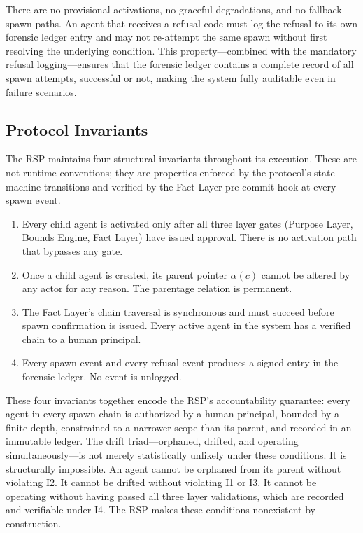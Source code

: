 There are no provisional activations, no graceful degradations, and no fallback spawn paths. An agent that receives a refusal code must log the refusal to its own forensic ledger entry and may not re-attempt the same spawn without first resolving the underlying condition. This property—combined with the mandatory refusal logging—ensures that the forensic ledger contains a complete record of all spawn attempts, successful or not, making the system fully auditable even in failure scenarios.

\subsection{Protocol Invariants}

The RSP maintains four structural invariants throughout its execution. These are not runtime conventions; they are properties enforced by the protocol's state machine transitions and verified by the Fact Layer pre-commit hook at every spawn event.

\begin{enumerate}
    \item[\textbf{I1 — No orphan activation.}] Every child agent is activated only after all three layer gates (Purpose Layer, Bounds Engine, Fact Layer) have issued approval. There is no activation path that bypasses any gate.
    \item[\textbf{I2 — Immutable parentage.}] Once a child agent is created, its parent pointer $\alpha(c)$ cannot be altered by any actor for any reason. The parentage relation is permanent.
    \item[\textbf{I3 — Verified chain termination.}] The Fact Layer's chain traversal is synchronous and must succeed before spawn confirmation is issued. Every active agent in the system has a verified chain to a human principal.
    \item[\textbf{I4 — Complete ledger coverage.}] Every spawn event and every refusal event produces a signed entry in the forensic ledger. No event is unlogged.
\end{enumerate}

These four invariants together encode the RSP's accountability guarantee: every agent in every spawn chain is authorized by a human principal, bounded by a finite depth, constrained to a narrower scope than its parent, and recorded in an immutable ledger. The drift triad—orphaned, drifted, and operating simultaneously—is not merely statistically unlikely under these conditions. It is structurally impossible. An agent cannot be orphaned from its parent without violating I2. It cannot be drifted without violating I1 or I3. It cannot be operating without having passed all three layer validations, which are recorded and verifiable under I4. The RSP makes these conditions nonexistent by construction.

